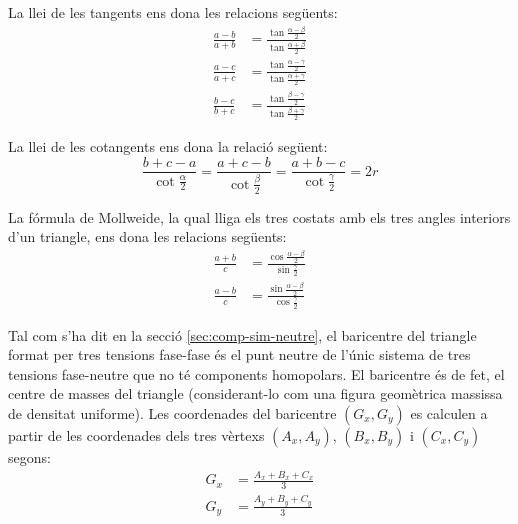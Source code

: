 La llei de les tangents ens dona les relacions següents:
\begin{subequations}
\begin{align}
    \frac{a-b}{a+b} &= \frac{\tan\frac{\alpha-\beta}{2}}{\tan\frac{\alpha+\beta}{2}} \\[1ex]
    \frac{a-c}{a+c} &= \frac{\tan\frac{\alpha-\gamma}{2}}{\tan\frac{\alpha+\gamma}{2}} \\[1ex]
    \frac{b-c}{b+c} &= \frac{\tan\frac{\beta-\gamma}{2}}{\tan\frac{\beta+\gamma}{2}}
\end{align}
\end{subequations}

La llei de les cotangents ens dona la relació següent:
\begin{equation}
    \frac{b+c-a}{\cot\frac{\alpha}{2}} = \frac{a+c-b}{\cot\frac{\beta}{2}} =
    \frac{a+b-c}{\cot\frac{\gamma}{2}} = 2 r
\end{equation}

La fórmula de Mollweide, la qual lliga els tres costats amb els tres angles interiors d'un triangle, ens dona les relacions següents:
\begin{subequations}
\begin{align}
    \frac{a+b}{c} &= \frac{\cos\frac{\alpha-\beta}{2}}{\sin\frac{\gamma}{2}} \\[1ex]
    \frac{a-b}{c} &= \frac{\sin\frac{\alpha-\beta}{2}}{\cos\frac{\gamma}{2}}
\end{align}
\end{subequations}

Tal com s'ha dit en la secció \vref{sec:comp-sim-neutre}, el baricentre del triangle format per tres tensions fase-fase és el punt neutre de l'únic sistema de tres tensions fase-neutre que no té components homopolars. El baricentre és de fet, el centre de masses del triangle (considerant-lo com una figura geomètrica massissa de densitat uniforme).  Les coordenades del baricentre $(G_x,G_y)$ es calculen a partir de les coordenades dels tres vèrtexs $(A_x,A_y)$, $(B_x,B_y)$ i $(C_x,C_y)$ segons:
\begin{subequations}
\begin{align}
    G_x &= \frac{A_x + B_x + C_x}{3} \label{eq:bari_x}\\[1ex]
    G_y &= \frac{A_y + B_y + C_y}{3} \label{eq:bari_y}
\end{align}
\end{subequations}

